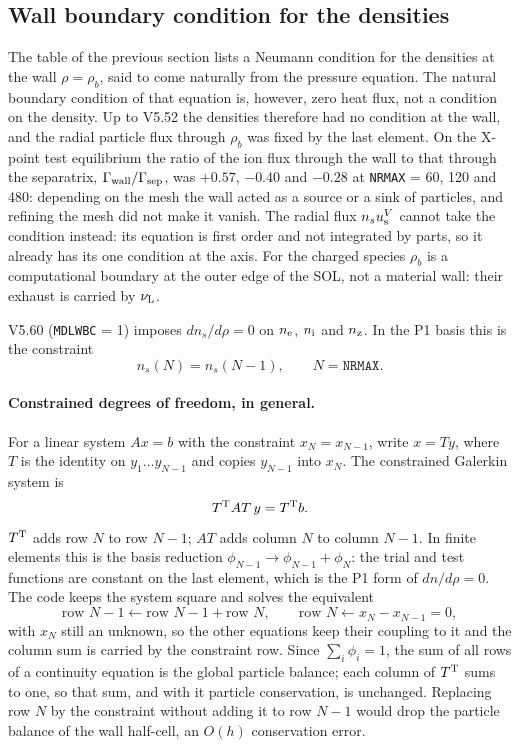 \documentclass[11pt]{article}
\def\r#1{{\rm#1}}
\def\nee{n_\r{e}}
\def\ni{n_\r{i}}
\def\nz{n_\r{z}}
\def\uV#1{u_\r{#1}^V}
\def\nuL{\nu_\r{L}}
\begin{document}
\subsection{Wall boundary condition for the densities}
\label{sec:wallbc}

The table of the previous section lists a Neumann condition for the densities
at the wall $\rho=\rho_b$, said to come naturally from the pressure equation.
The natural boundary condition of that equation is, however, zero heat flux, not
a condition on the density.  Up to V5.52 the densities therefore had no
condition at the wall, and the radial particle flux through $\rho_b$ was fixed by
the last element.  On the X-point test equilibrium the ratio of the ion flux
through the wall to that through the separatrix,
$\Gamma_\r{wall}/\Gamma_\r{sep}$, was $+0.57$, $-0.40$ and $-0.28$ at
\texttt{NRMAX} = 60, 120 and 480: depending on the mesh the wall acted as a
source or a sink of particles, and refining the mesh did not make it vanish.  The radial flux
$n_s\uV{s}$ cannot take the condition instead: its equation is first order and
not integrated by parts, so it already has its one condition at the axis.
For the charged species $\rho_b$ is a computational boundary at the outer edge of
the SOL, not a material wall: their exhaust is carried by $\nuL$.

V5.60 (\texttt{MDLWBC} = 1) imposes $dn_s/d\rho = 0$ on $\nee$, $\ni$ and $\nz$.
In the P1 basis this is the constraint
\begin{equation}
  n_s(N) = n_s(N-1),\qquad N = \texttt{NRMAX}.
\end{equation}

\paragraph{Constrained degrees of freedom, in general.}
For a linear system $A x = b$ with the constraint $x_N = x_{N-1}$, write
$x = T y$, where $T$ is the identity on $y_1\dots y_{N-1}$ and copies $y_{N-1}$
into $x_N$.  The constrained Galerkin system is
\begin{equation}
  T^\r{T} A T\, y = T^\r{T} b .
\end{equation}
$T^\r{T}$ adds row $N$ to row $N-1$; $AT$ adds column $N$ to column $N-1$.  In
finite elements this is the basis reduction $\phi_{N-1}\to\phi_{N-1}+\phi_N$:
the trial and test functions are constant on the last element, which is the
P1 form of $dn/d\rho=0$.  The code keeps the system square and solves the
equivalent
\begin{equation}
  \mbox{row } N-1 \leftarrow \mbox{row } N-1 + \mbox{row } N,\qquad
  \mbox{row } N \leftarrow x_N - x_{N-1} = 0 ,
\end{equation}
with $x_N$ still an unknown, so the other equations keep their coupling to it and
the column sum is carried by the constraint row.
Since $\sum_i\phi_i = 1$, the sum of all rows of a continuity equation is the
global particle balance; each column of $T^\r{T}$ sums to one, so that sum,
and with it particle conservation, is unchanged.  Replacing row $N$ by the
constraint without adding it to row $N-1$ would drop the particle balance of the
wall half-cell, an $O(h)$ conservation error.
\end{document}
